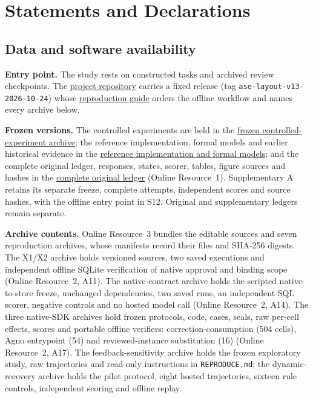 \documentclass[pdflatex,sn-basic]{sn-jnl}
\begin{document}
\section*{Statements and Declarations}
\subsection*{Data and software availability}
\textbf{Entry point.} The study rests on constructed tasks and archived review checkpoints. The \href{https://github.com/lhh666-6/auto-dete}{project repository} carries a fixed release (tag \texttt{ase-layout-v13-2026-10-24}) whose \href{https://github.com/lhh666-6/auto-dete/blob/ase-layout-v13-2026-10-24/REPRODUCIBILITY.md}{reproduction guide} orders the offline workflow and names every archive below.

\textbf{Frozen versions.} The controlled experiments are held in the \href{https://github.com/lhh666-6/auto-dete/tree/2645e5e18c900ea91c9c980e44195dc71e410432/DKE-supplement}{frozen controlled-experiment archive}; the reference implementation, formal models and earlier historical evidence in the \href{https://github.com/lhh666-6/auto-dete/tree/c6d512843c905cab6d8521dd8c914f7fb26d85ae/latest}{reference implementation and formal models}; and the complete original ledger, responses, states, scorer, tables, figure sources and hashes in the \href{https://github.com/lhh666-6/auto-dete/tree/475e66f549613aaaaa62c2ec81ffdee483636c54/cloud-handoff}{complete original ledger} (Online Resource~1). Supplementary A retains its separate freeze, complete attempts, independent scores and source hashes, with the offline entry point in S12. Original and supplementary ledgers remain separate.

\textbf{Archive contents.} Online Resource~3 bundles the editable sources and seven reproduction archives, whose manifests record their files and SHA-256 digests. The X1/X2 archive holds versioned sources, two saved executions and independent offline SQLite verification of native approval and binding scope (Online Resource~2, A11). The native-contract archive holds the scripted native-to-store freeze, unchanged dependencies, two saved runs, an independent SQL scorer, negative controls and no hosted model call (Online Resource~2, A14). The three native-{SDK} archives hold frozen protocols, code, cases, seals, raw per-cell effects, scores and portable offline verifiers: correction-consumption (504 cells), Agno entrypoint (54) and reviewed-instance substitution (16) (Online Resource~2, A17). The feedback-sensitivity archive holds the frozen exploratory study, raw trajectories and read-only instructions in \nolinkurl{REPRODUCE.md}; the dynamic-recovery archive holds the pilot protocol, eight hosted trajectories, sixteen rule controls, independent scoring and offline replay.
\end{document}
